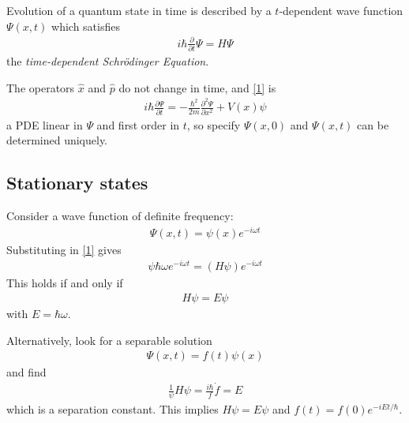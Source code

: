 \documentclass[a4paper]{article}
\begin{document}
Evolution of a quantum state in time is described by a $t$-dependent wave function $\Psi\left(x,t\right)$ which satisfies
\begin{equation}\label{1}
\begin{aligned}
i\hbar \frac{\partial}{\partial t} \Psi = H \Psi
\end{aligned}
\end{equation}
the \emph{time-dependent Schr\"{o}dinger Equation}.

The operators $\hat{x}$ and $\hat{p}$ do not change in time, and \eqref{1} is
\begin{equation*}
\begin{aligned}
i\hbar \frac{\partial \Psi}{\partial t} = -\frac{\hbar^2}{2m} \frac{\partial^2 \Psi}{\partial x^2} + V\left(x\right) \psi
\end{aligned}
\end{equation*}
a PDE linear in $\Psi$ and first order in $t$, so specify $\Psi\left(x,0\right)$ and $\Psi\left(x,t\right)$ can be determined uniquely.

\subsection{Stationary states}
Consider a wave function of definite frequency:
\begin{equation*}
\begin{aligned}
\Psi\left(x,t\right) = \psi\left(x\right) e^{-i\omega t}
\end{aligned}
\end{equation*}
Substituting in \eqref{1} gives
\begin{equation*}
\begin{aligned}
\psi \hbar \omega e^{-i\omega t} = \left(H\psi\right) e^{-i\omega t}
\end{aligned}
\end{equation*}
This holds if and only if
\begin{equation*}
\begin{aligned}
H \psi = E\psi
\end{aligned}
\end{equation*}
with $E = \hbar \omega$.

Alternatively, look for a separable solution
\begin{equation*}
\begin{aligned}
\Psi\left(x,t\right) = f\left(t\right)\psi\left(x\right)
\end{aligned}
\end{equation*}
and find
\begin{equation*}
\begin{aligned}
\frac{1}{\psi} H \psi = \frac{i\hbar}{f}\dot{f} = E
\end{aligned}
\end{equation*}
which is a separation constant. This implies $H\psi = E\psi$ and $f\left(t\right) = f\left(0\right) e^{-iEt/\hbar}$.
\end{document}
